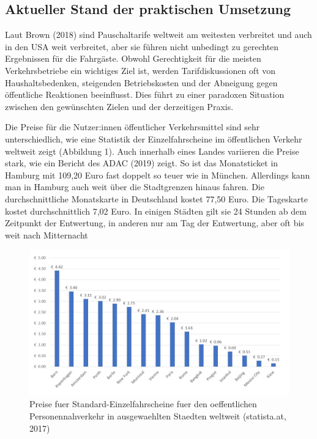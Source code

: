 \documentclass[
]{book}
\begin{document}
\hypertarget{aktueller-stand-der-praktischen-umsetzung-23}{%
\subsection*{Aktueller Stand der praktischen Umsetzung}\label{aktueller-stand-der-praktischen-umsetzung-23}}

Laut Brown (2018) sind Pauschaltarife weltweit am weitesten verbreitet und auch in den USA weit verbreitet, aber sie führen nicht unbedingt zu gerechten Ergebnissen für die Fahrgäste. Obwohl Gerechtigkeit für die meisten Verkehrsbetriebe ein wichtiges Ziel ist, werden Tarifdiskussionen oft von Haushaltsbedenken, steigenden Betriebskosten und der Abneigung gegen öffentliche Reaktionen beeinflusst. Dies führt zu einer paradoxen Situation zwischen den gewünschten Zielen und der derzeitigen Praxis.

Die Preise für die Nutzer:innen öffentlicher Verkehrsmittel sind sehr unterschiedlich, wie eine Statistik der Einzelfahrscheine im öffentlichen Verkehr weltweit zeigt (Abbildung 1). Auch innerhalb eines Landes variieren die Preise stark, wie ein Bericht des ADAC (2019) zeigt. So ist das Monatsticket in Hamburg mit 109,20 Euro fast doppelt so teuer wie in München. Allerdings kann man in Hamburg auch weit über die Stadtgrenzen hinaus fahren. Die durchschnittliche Monatskarte in Deutschland kostet 77,50 Euro. Die Tageskarte kostet durchschnittlich 7,02 Euro. In einigen Städten gilt sie 24 Stunden ab dem Zeitpunkt der Entwertung, in anderen nur am Tag der Entwertung, aber oft bis weit nach Mitternacht

\begin{figure}
\includegraphics[width=1\linewidth]{image/tickets_prices} \caption{Preise fuer Standard-Einzelfahrscheine fuer den oeffentlichen Personennahverkehr in ausgewaehlten Staedten weltweit (statista.at, 2017)}\label{fig:unnamed-chunk-28}
\end{figure}
\end{document}
